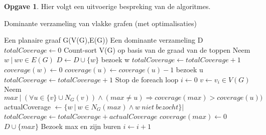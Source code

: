 \documentclass[11pt, a4paper, table]{article}
\makeatletter
\newenvironment{algoritme}[1][H]{%
	\renewcommand{\ALG@name}{Algoritme}%
	\renewcommand{\algorithmicrequire}{\textbf{Input:}}
	\renewcommand{\algorithmicensure}{\textbf{Output:}}
	\begin{algorithm}[#1]%
	}{\end{algorithm}}
\theoremstyle{definition}
\newtheorem{opgave}{Opgave}
\makeatother
\begin{document}
\begin{opgave}
		Hier volgt een uitvoerige bespreking van de algoritmes. 
		\begin{tcolorbox}[blanker,float=tbp, grow to left by=2cm,grow to right by=2cm]
		\begin{algoritme}
			\caption{Dominante verzameling van vlakke grafen (met optimalisaties)}
			\begin{algorithmic}[1]
				\Require Een planaire graaf G(V(G),E(G))
				\Ensure Een dominante verzameling D
				\State $totalCoverage \gets 0$
				\State Count-sort V(G) op basis van de graad van de toppen\label{sortoperation}
				\label{startoptimalizationloop1}
					\State Neem $w\ |\ wv \in E(G)$
						\State $D \gets D \cup \{w\}$
						\State bezoek w 
						\State $totalCoverage \gets totalCoverage+1$
						\State $coverage(w) \gets 0$
					\EndIf 
						\State $coverage(u) \gets coverage(u) - 1$
							\State bezoek u
							\State $totalCoverage \gets totalCoverage + 1 $
						\EndIf
					\EndFor
						\State Stop de foreach loop
					\EndIf 
				\EndFor\label{endoptimalizationloop1}
				 \label{startoptimalizationloop2}
					\State $i \gets 0$
					\label{startactualalgorithmloop}
					\State $v \gets v_i \in V(G)$
							\State Neem $max\ |\ (\forall u \in \{v\} \cup N_G(v)) \land (max \ne u) \Rightarrow coverage(max)>coverage(u))$
								\State actualCoverage $\gets \{w\ |\ w \in N_G(max) \land w\ niet \  bezocht\}|$\label{neighbourloop2}
									\State $totalCoverage \gets totalCoverage + actualCoverage$
									\State $coverage(max)  \gets 0$
									\State $ D \cup \{max\}$
									\State Bezoek max en zijn buren\label{neighbourloop3}
								\EndIf 
							\EndIf
						\EndIf
						\State $i \gets i+1$
					\EndWhile\label{endactualalgorithmloop}
				\EndFor\label{endoptimalizationloop2}
				
			\end{algorithmic}
		\end{algoritme}
		\end{tcolorbox}


\end{opgave}
\end{document}
